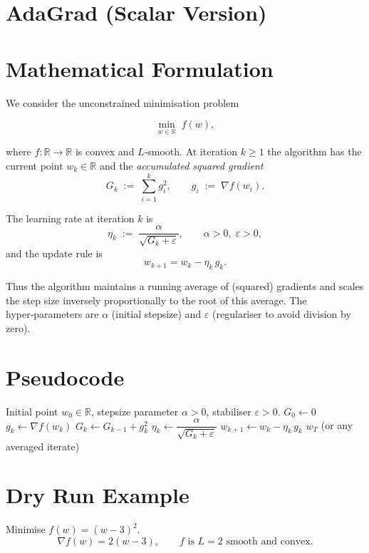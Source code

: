 \documentclass{article}
\newcommand{\R}{\mathbb{R}}
\begin{document}
\section*{AdaGrad (Scalar Version)}

\section*{Mathematical Formulation}
We consider the unconstrained minimisation problem  

\[
\min_{w\in\R} \; f(w),
\]

where $f:\R\rightarrow\R$ is convex and $L$‑smooth.  
At iteration $k\ge 1$ the algorithm has the current point $w_k\in\R$ and the
\emph{accumulated squared gradient}
\[
G_k \;:=\; \sum_{i=1}^{k} g_i^{2},\qquad 
g_i \;:=\; \nabla f(w_i).
\]

The learning rate at iteration $k$ is
\[
\eta_k \;:=\; \frac{\alpha}{\sqrt{G_k+\varepsilon}},\qquad 
\alpha>0,\;\varepsilon>0,
\]
and the update rule is
\[
\boxed{w_{k+1}= w_k - \eta_k\, g_k } .
\]

Thus the algorithm maintains a running average of (squared) gradients and
scales the step size inversely proportionally to the root of this average.
The hyper‑parameters are $\alpha$ (initial stepsize) and $\varepsilon$ (regulariser
to avoid division by zero).

\section*{Pseudocode}
\begin{algorithm}[H]
\caption{Scalar AdaGrad}
\begin{algorithmic}[1]
\Require Initial point $w_0\in\R$, stepsize parameter $\alpha>0$, 
        stabiliser $\varepsilon>0$.
\State $G_0 \gets 0$ 
    \State $g_k \gets \nabla f(w_k)$
    \State $G_k \gets G_{k-1}+ g_k^{2}$ 
    \State $\eta_k \gets \dfrac{\alpha}{\sqrt{G_k+\varepsilon}}$
    \State $w_{k+1} \gets w_k - \eta_k\, g_k$
\EndFor
\State \Return $w_T$ (or any averaged iterate)
\end{algorithmic}
\end{algorithm}

\section*{Dry Run Example}
Minimise $f(w)=(w-3)^2$.
\[
\nabla f(w)=2(w-3),\qquad f\text{ is $L=2$ smooth and convex.}
\]
\end{document}
